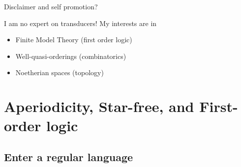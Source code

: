 \documentclass{beamer}
\begin{document}
\begin{frame}
    \maketitle
\end{frame}

\begin{frame}{Disclaimer \hfill and self promotion?}
    \begin{block}{I am no expert on transducers!}
        My interests are in 
        \begin{itemize}[<+->]
            \item Finite Model Theory \hfill (first order logic)
            \item Well-quasi-orderings \hfill (combinatorics)
            \item Noetherian spaces \hfill (topology)
        \end{itemize}
    \end{block}
\end{frame}

\section{Aperiodicity, Star-free, and First-order logic}
\subsection{Enter a regular language}
\end{document}
